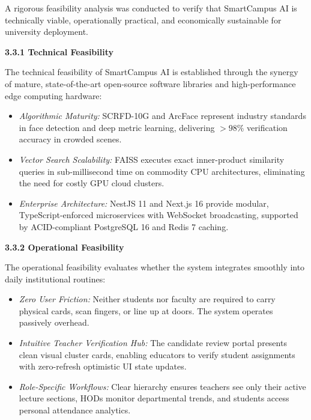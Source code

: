 \noindent A rigorous feasibility analysis was conducted to verify that SmartCampus AI is technically viable, operationally practical, and economically sustainable for university deployment.

\vspace{0.15in}
\begin{flushleft}
{\fontsize{12pt}{16pt}\selectfont \textbf{3.3.1 Technical Feasibility}}\\[1mm]
\end{flushleft}

\noindent The technical feasibility of SmartCampus AI is established through the synergy of mature, state-of-the-art open-source software libraries and high-performance edge computing hardware:
\begin{itemize}
    \item \textit{Algorithmic Maturity:} SCRFD-10G and ArcFace represent industry standards in face detection and deep metric learning, delivering $>98\%$ verification accuracy in crowded scenes.
    \item \textit{Vector Search Scalability:} FAISS executes exact inner-product similarity queries in sub-millisecond time on commodity CPU architectures, eliminating the need for costly GPU cloud clusters.
    \item \textit{Enterprise Architecture:} NestJS 11 and Next.js 16 provide modular, TypeScript-enforced microservices with WebSocket broadcasting, supported by ACID-compliant PostgreSQL 16 and Redis 7 caching.
\end{itemize}

\vspace{0.15in}
\begin{flushleft}
{\fontsize{12pt}{16pt}\selectfont \textbf{3.3.2 Operational Feasibility}}\\[1mm]
\end{flushleft}

\noindent The operational feasibility evaluates whether the system integrates smoothly into daily institutional routines:
\begin{itemize}
    \item \textit{Zero User Friction:} Neither students nor faculty are required to carry physical cards, scan fingers, or line up at doors. The system operates passively overhead.
    \item \textit{Intuitive Teacher Verification Hub:} The candidate review portal presents clean visual cluster cards, enabling educators to verify student assignments with zero-refresh optimistic UI state updates.
    \item \textit{Role-Specific Workflows:} Clear hierarchy ensures teachers see only their active lecture sections, HODs monitor departmental trends, and students access personal attendance analytics.
\end{itemize}

